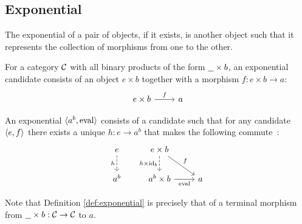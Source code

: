 \subsection{Exponential}
The exponential of a pair of objects, if it exists, is another object such that
it represents the collection of morphisms from one to the other.
\begin{definition}

  For a category $\mathcal{C}$ with all binary products of the form $\underline{\ \ }\times b$, an
  exponential candidate consists of an object $e\times b$ together with a morphism $f: e\times b\to a$:
  \[\begin{tikzcd}[ampersand replacement=\&]
    {e\times b} \& a
    \arrow["f", from=1-1, to=1-2]
  \end{tikzcd}\]

  An exponential $\langle a^b,\mathrm{eval}\rangle$ consists of a candidate
  such that for any candidate $\langle e, f\rangle$ there exists a unique $h:e\to a^b$ that
  makes the following commute~\parencite[p.~121]{awodey:category_theory}:
  \[\begin{tikzcd}[ampersand replacement=\&]
    e \& {e\times b} \\
    {a^b} \& {a^b\times b} \& a
    \arrow["{\mathrm{eval}}"', from=2-2, to=2-3]
    \arrow["{h\times\id_b}"', dashed, from=1-2, to=2-2]
    \arrow["f", from=1-2, to=2-3]
    \arrow["h"', dashed, from=1-1, to=2-1]
  \end{tikzcd}\]
\end{definition}

\begin{remark}
  Note that Definition \ref{def:exponential} is precisely that of a terminal
  morphism from $\underline{\ \ }\times b: \mathcal{C}\to \mathcal{C}$ to $a$.
\end{remark}
